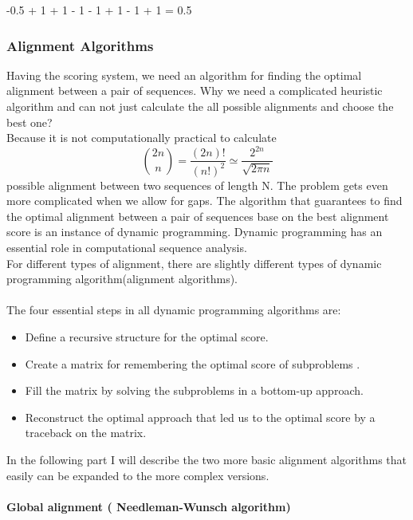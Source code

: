 \documentclass[11pt,a4paper]{report}
\begin{document}
-0.5 + 1 + 1 - 1 - 1 + 1 - 1 + 1 = 0.5

\subsubsection{Alignment Algorithms} \label{Alignment Algorithms}

Having the scoring system, we need an algorithm for finding the optimal alignment 
between a pair of sequences. Why we need a complicated heuristic algorithm and can
not just calculate the all possible alignments and choose the best one?\\
Because it is not computationally practical to calculate  
$$ \binom{2n}{n} = \frac{(2n)!}{(n!)^2} \simeq \frac{2^{2n}}{\sqrt{2\pi n}} $$
possible alignment between two sequences of length N. The problem gets even more complicated when we allow for gaps. 
The algorithm that guarantees to find the optimal alignment between a pair of sequences base on the best alignment 
score is an instance of dynamic programming. 
Dynamic programming has an essential role in computational sequence analysis.\\ 
For different types of alignment, there are slightly different types of dynamic programming algorithm(alignment algorithms).\\\\

The four essential steps in all dynamic programming algorithms are:

\begin{itemize} 
	\item Define a recursive structure for the optimal score\cite{eddydynamic}.
	\item  Create a  matrix for remembering the optimal score of subproblems \cite{eddydynamic}.	
	\item Fill the matrix by solving the  subproblems in a bottom-up approach\cite{eddydynamic}.
	\item Reconstruct the optimal approach that led us to the optimal score by a traceback on the matrix\cite{eddydynamic}.
\end{itemize}

In the following part I will describe the two more basic alignment algorithms that easily can be expanded to the more complex versions.

\paragraph{ Global alignment ( Needleman-Wunsch algorithm) }
\end{document}
